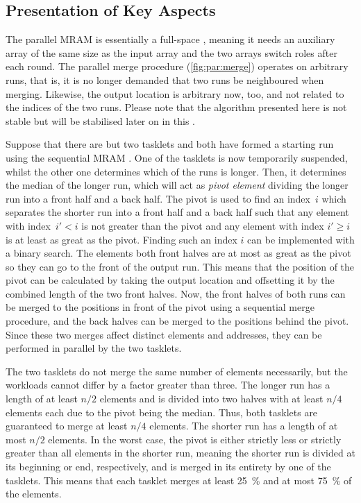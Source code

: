 \subsection{Presentation of Key Aspects}
\label{sec:mram:par:aspects}

The parallel \ac{MRAM} \MS{} is essentially a full-space \MS{}, meaning it needs an auxiliary array of the same size as the input array and the two arrays switch roles after each round.
The parallel merge procedure (\cref{fig:par:merge}) operates on arbitrary runs, that is, it is no longer demanded that two runs be neighboured when merging.
Likewise, the output location is arbitrary now, too, and not related to the indices of the two runs.
Please note that the algorithm presented here is not stable but will be stabilised later on in this .

Suppose that there are but two tasklets and both have formed a starting run using the sequential \ac{MRAM} \MS{}.
One of the tasklets is now temporarily suspended, whilst the other one determines which of the runs is longer.
Then, it determines the median of the longer run, which will act as \emph{pivot element} dividing the longer run into a front half and a back half.
The pivot is used to find an index~\(i\) which separates the shorter run into a front half and a back half such that any element with index~\(i' < i\) is not greater than the pivot and any element with index \(i' \ge i\) is at least as great as the pivot.
Finding such an index \(i\) can be implemented with a binary search.
The elements both front halves are at most as great as the pivot so they can go to the front of the output run.
This means that the position of the pivot can be calculated by taking the output location and offsetting it by the combined length of the two front halves.
Now, the front halves of both runs can be merged to the positions in front of the pivot using a sequential merge procedure, and the back halves can be merged to the positions behind the pivot.
Since these two merges affect distinct elements and addresses, they can be performed in parallel by the two tasklets.

The two tasklets do not merge the same number of elements necessarily, but the workloads cannot differ by a factor greater than three.
The longer run has a length of at least \(n/2\) elements and is divided into two halves with at least \(n/4\) elements each due to the pivot being the median.
Thus, both tasklets are guaranteed to merge at least \(n/4\) elements.
The shorter run has a length of at most \(n/2\) elements.
In the worst case, the pivot is either strictly less or strictly greater than all elements in the shorter run, meaning the shorter run is divided at its beginning or end, respectively, and is merged in its entirety by one of the tasklets.
This means that each tasklet merges at least \qty{25}{\percent} and at most \qty{75}{\percent} of the elements.

